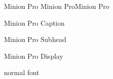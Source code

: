 \documentclass{article}
\begin{document}
Minion Pro \fontc Minion Pro\fontsize{14}{15}Minion Pro

\fontsize{50}{52}
\fontd Minion Pro Caption

\fontb Minion Pro Subhead

\fonta Minion Pro Display

\normalfont\normalsize normal font
\end{document}
